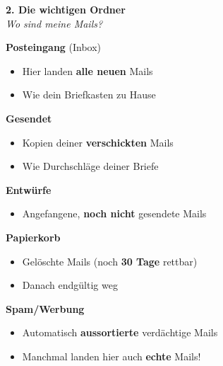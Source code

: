 \documentclass[a4paper,landscape,8pt]{extarticle}
\begin{document}
\hfill%
\begin{minipage}[t]{0.32\linewidth}
\begin{center}
\colorbox{foldergreen!10}{%
\begin{minipage}{0.95\linewidth}
\vspace{2mm}
\begin{center}
{\Large\bfseries\textcolor{foldergreen}{2. Die wichtigen Ordner}}\\[1pt]
{\footnotesize\itshape Wo sind meine Mails?}
\end{center}
\vspace{2mm}
\end{minipage}%
}
\end{center}

\vspace{1mm}

\textbf{Posteingang} (Inbox)
\begin{itemize}
\item Hier landen \textbf{alle neuen} Mails
\item Wie dein Briefkasten zu Hause
\end{itemize}

\textbf{Gesendet}
\begin{itemize}
\item Kopien deiner \textbf{verschickten} Mails
\item Wie Durchschläge deiner Briefe
\end{itemize}

\textbf{Entwürfe}
\begin{itemize}
\item Angefangene, \textbf{noch nicht} gesendete Mails
\end{itemize}

\textbf{Papierkorb}
\begin{itemize}
\item Gelöschte Mails (noch \textbf{30 Tage} rettbar)
\item Danach endgültig weg
\end{itemize}

\textbf{Spam/Werbung}
\begin{itemize}
\item Automatisch \textbf{aussortierte} verdächtige Mails
\item Manchmal landen hier auch \textbf{echte} Mails!
\end{itemize}

\end{minipage}%
\hfill%
\end{document}
